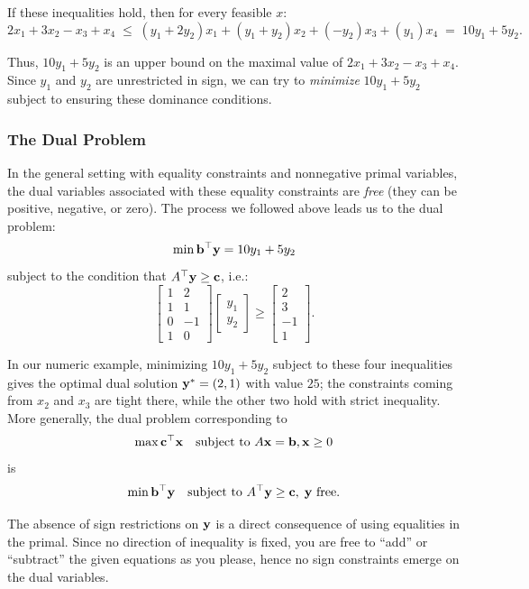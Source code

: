 If these inequalities hold, then for every feasible $x$:
\[
2x_1 + 3x_2 - x_3 + x_4 \;\leq\; (y_1+2y_2)x_1 + (y_1+y_2)x_2 + (-y_2)x_3 + (y_1)x_4 \;=\; 10y_1 + 5y_2.
\]

Thus, $10y_1 + 5y_2$ is an upper bound on the maximal value of $2x_1 + 3x_2 - x_3 + x_4$. Since $y_1$ and $y_2$ are unrestricted in sign, we can try to \emph{minimize} $10y_1 + 5y_2$ subject to ensuring these dominance conditions.

\subsubsection*{The Dual Problem}

In the general setting with equality constraints and nonnegative primal variables, the dual variables associated with these equality constraints are \emph{free} (they can be positive, negative, or zero). The process we followed above leads us to the dual problem:
\[
\min \mathbf{b}^\top \mathbf{y} = 10y_1 + 5y_2
\]
subject to the condition that $A^\top \mathbf{y} \geq \mathbf{c}$, i.e.:
\[
\begin{bmatrix}
1 & 2 \\
1 & 1 \\
0 & -1 \\
1 & 0
\end{bmatrix}
\begin{bmatrix}y_1 \\ y_2\end{bmatrix} 
\geq
\begin{bmatrix}2 \\ 3 \\ -1 \\ 1\end{bmatrix}.
\]

In our numeric example, minimizing $10y_1 + 5y_2$ subject to these four inequalities gives the optimal dual solution $\mathbf{y}^* = (2, 1)$ with value $25$; the constraints coming from $x_2$ and $x_3$ are tight there, while the other two hold with strict inequality. More generally, the dual problem corresponding to
\[
\max \mathbf{c}^\top \mathbf{x} \quad\mbox{subject to } A \mathbf{x} = \mathbf{b}, \mathbf{x} \geq 0
\]
is
\[
\min \mathbf{b}^\top \mathbf{y} \quad \mbox{subject to } A^\top \mathbf{y} \geq \mathbf{c},\; \mathbf{y} \mbox{ free}.
\]

The absence of sign restrictions on $\mathbf{y}$ is a direct consequence of using equalities in the primal. Since no direction of inequality is fixed, you are free to ``add'' or ``subtract'' the given equations as you please, hence no sign constraints emerge on the dual variables.

